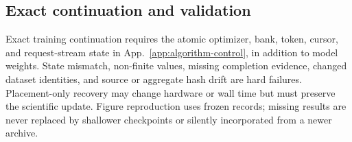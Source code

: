 \documentclass{article}
\newcommand{\1}{\mathbf 1}
\theoremstyle{remark}
\theoremstyle{definition}
\theoremstyle{plain}
\begin{document}
\subsection{Exact continuation and validation}
\label{app:repro-recovery}

Exact training continuation requires the atomic optimizer, bank, token,
cursor, and request-stream state in App.~\ref{app:algorithm-control},
in addition to model weights. State mismatch, non-finite values, missing
completion evidence, changed dataset identities, and source or aggregate
hash drift are hard failures. Placement-only recovery may change hardware
or wall time but must preserve the scientific update. Figure reproduction
uses frozen records; missing results are never replaced by shallower
checkpoints or silently incorporated from a newer archive.
\end{document}
